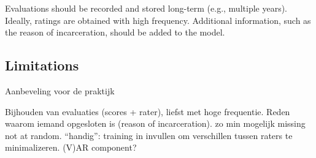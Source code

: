 \documentclass{article}
\begin{document}
Evaluations should be recorded and stored long-term (e.g., multiple years). Ideally, ratings are obtained with high frequency. Additional information, such as the reason of incarceration, should be added to the model.


\subsection*{Limitations}

Aanbeveling voor de praktijk

Bijhouden van evaluaties (scores + rater), liefst met hoge frequentie. 
Reden waarom iemand opgesloten is (reason of incarceration).
zo min mogelijk missing not at random.
``handig'': training in invullen om verschillen tussen raters te minimalizeren.
(V)AR component?



\end{document}
